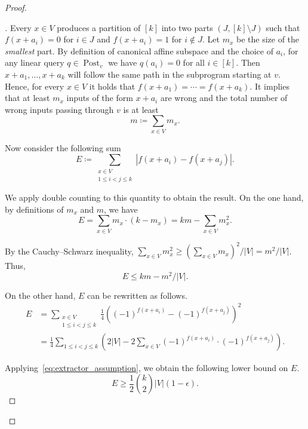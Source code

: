 \documentclass[a4paper,11pt,draft]{article}
\theoremstyle{definition}
\theoremstyle{remark}
\newenvironment{claimproof}[1][\proofname]{\begin{proof}[#1]\renewcommand*{\qedsymbol}{$\blacksquare$}}{\end{proof}}
\DeclareMathOperator{\post}{Post}
\newcommand{\card}[1]{{\left|#1\right|}}
\begin{document}
\begin{proof}
\begin{claimproof}
    Every $x \in V$ produces a partition of $[k]$ into two parts $(J, [k] \setminus J)$ such that $f(x+a_i) = 0$ for $i \in J$ and $f(x+a_i) = 1$ for $i \not\in J$. Let $m_x$ be the size of the \emph{smallest} part.
    By definition of canonical affine subspace and the choice of $a_i$, for any linear query $q \in \post_v$ we have $q(a_i) = 0$ for all $i \in [k]$. Then $x+a_1, \ldots, x+a_k$ will follow the same path in the subprogram starting at $v$. Hence, for every $x \in V$ it holds that $f(x+a_1) = \cdots = f(x+a_k)$. It implies that at least $m_x$ inputs of the form $x+a_i$ are wrong and the total number of wrong inputs passing through $v$ is at least
    \[
      m \coloneqq \sum_{x \in V} m_x.
    \]
  
    Now consider the following sum
    \[
%
      E \coloneqq
      \sum_{\substack{x \in V \\ 1\le i<j \le k}} |f(x+a_i) - f(x+a_j)|.
    \]

    We apply double counting to this quantity to obtain the result.
    On the one hand, by definitions of $m_x$ and $m$, we have
    \begin{equation*}
      E = \sum_{x \in V} m_x \cdot (k - m_x) = k m - \sum_{x \in V} m_x^2.
    \end{equation*}
  
    By the Cauchy--Schwarz inequality, $\sum_{x \in V} m_x^2 \ge {\left(\sum_{x \in V} m_x\right)}^2 / \card{V} = m^2/\card{V}$. Thus,
    \begin{equation}\label{eq:bad_inputs_upper_bound}
      E \le km-m^2/\card{V}.
    \end{equation}
  
    On the other hand, $E$ can be rewritten as follows.
    \begin{equation*}
      \begin{aligned}
%
        E &=
        \sum_{\substack{x \in V \\ 1\le i<j \le k}} \frac{1}{4} {\left({(-1)}^{f(x+a_i)} - {(-1)}^{f(x+a_j)}\right)}^2 \\ &=
        \frac{1}{4} \sum_{1 \le i < j \le k} \left( 2\card{V} - 2\sum_{x\in V} {(-1)}^{f(x+a_i)} \cdot {(-1)}^{f(x+a_j)}\right).
      \end{aligned}
    \end{equation*}

    Applying~\eqref{eq:extractor_assumption}, we obtain the following lower bound on $E$.
    \begin{equation}\label{eq:bad_inputs_lower_bound}
      E \ge \frac{1}{2} \binom{k}{2} \card{V} (1-\epsilon).
    \end{equation}
  

\end{claimproof}
\end{proof}
\end{document}
